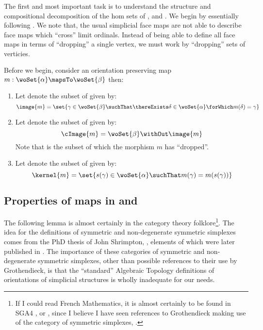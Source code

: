 The first and most important task is to understand the structure and compositional
decomposition of the hom sets of \sDeltaC{}{}, \DeltaC{}{} and \ndDeltaC{}{}.  We begin by
essentially following \cite[Notation 3 and Observations 7 and 8]{arxiv2005math0410412v2}. 
We note that, the usual simplicial face maps are not able to describe face maps which
``cross'' limit ordinals.  Instead of being able to define all face maps in terms of
``dropping'' a single vertex, we must work by ``dropping'' sets of verticies.

Before we begin, consider an orientation preserving map $m : \woSet{\alpha} \mapsTo
\woSet{\beta}$ then:
\begin{enumerate}
\item Let  denote the subset of \woSet{\beta} given by:
\begin{equation*}
	\image{m} = \set{ \gamma \in \woSet{\beta} \suchThat \thereExists \delta \in \woSet{\alpha} \forWhich m(\delta) = \gamma }
\end{equation*}
\item Let  denote the subset of \woSet{\beta} given by:
\begin{equation*}
	\cImage{m} = \woSet{\beta} \withOut \image{m}
\end{equation*}
Note that  is the subset of \woSet{\beta} which the morphism $m$ has ``dropped''.
\item Let  denote the subset of \woSet{\alpha} given by:
\begin{equation*}
	\kernel{m} = \set{ s(\gamma) \in \woSet{\alpha} \suchThat m(\gamma) = m(s(\gamma)) }
\end{equation*}
\end{enumerate}

\subsection{Properties of maps in \texorpdfstring{\sNdDeltaC{}{}}{sNdDelta} and
\texorpdfstring{\sDeltaC{}{}}{ndDelta}}

The following lemma is almost certainly in the category theory folklore\footnote{If I
could read French Mathematics, it is almost certainly to be found in SGA4
\cite{artinGrothendieckVerdierBourbakiDeligneSaintDonat1963SGA41},
\cite{artinGrothendieckVerdierDeligneSaintDonat1963SGA42} or
\cite{artinGrothendieckVerdierDeligneSaintDonat1963SGA43}, since I believe I have seen
references to Grothendieck making use of the category of symmetric simplexes,
\sDeltaC{}{}.}. The idea for the definitions of symmetric and non-degenerate symmetric
simplexes comes from the PhD thesis of John Shrimpton, \cite[Diagram on page
29]{shrimpton1989graphsSymmetryCatMethods}, elements of which were later published in
\cite{brownMorrisShrimptonWensley2008graphCat}. The importance of these categories of
symmetric and non-degenerate symmetric simplexes, other than possible references to their
use by Grothendieck, is that the ``standard'' Algebraic Topology definitions of
orientations of simplicial structures is wholly inadequate for our needs.

